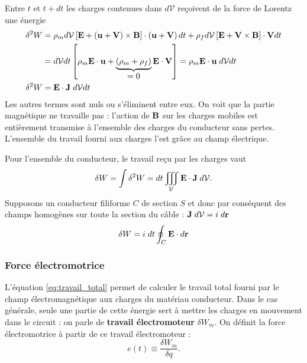 \documentclass[11pt,a4paper]{report}
\begin{document}
Entre $t$ et $t+dt$ les charges contenues dans $d\mathcal{V}$ reçoivent de la force de Lorentz une énergie
\begin{align*}
	\delta^2 W & 
	= \rho_m d\mathcal{V}\left[\bold{E}+\left(\bold{u}+\bold{V}\right)\times\bold{B}\right]
	\cdot\left(\bold{u}+\bold{V}\right)dt 
	+\rho_f d\mathcal{V}\left[\bold{E}+\bold{V}\times\bold{B}\right]\cdot\bold{V}dt\\
	& = d\mathcal{V}dt\left[\rho_m \bold{E}\cdot\bold{u} 
	+ \underbrace{\left(\rho_m + \rho_f\right)}_{\displaystyle{= 0}}
	\bold{E}\cdot\bold{\bold{V}}\right] 
	= \rho_m \bold{E}\cdot\bold{u}\;d\mathcal{V}dt\\
	\delta^2 W & = \bold{E}\cdot\bold{J}\;d\mathcal{V}dt 
\end{align*}
Les autres termes sont nuls ou s'éliminent entre eux. On voit que la partie magnétique ne travaille pas : l'action de $\bold{B}$ sur les charges mobiles est entièrement transmise à l'ensemble des charges du conducteur sans pertes. L'ensemble du travail fourni aux charges l'est grâce au champ électrique.

Pour l'ensemble du conducteur, le travail reçu par les charges vaut
\begin{equation}
	\delta W = \int \delta^2 W = dt\iiint_\mathcal{V} \bold{E}\cdot\bold{J}\;d\mathcal{V}.
\end{equation}
Supposons un conducteur filiforme $C$ de section $S$ et donc par conséquent des champs homogènes sur toute la section du câble : $\bold{J}\;d\mathcal{V} = i\;d\bold{r}$
\begin{equation}
	\delta W = i\;dt \oint_C \bold{E}\cdot d\bold{r}
	\label{eq:travail_total}
\end{equation}

\subsubsection{Force électromotrice}

L'équation \eqref{eq:travail_total} permet de calculer le travail total fourni par le champ électromagnétique aux charges du matériau conducteur. Dans le cas générale, seule une partie de cette énergie sert à mettre les charges en mouvement dans le circuit : on parle de \textbf{travail électromoteur} $\delta W_m$. On définit la force électromotrice à partir 
de ce travail électromoteur :
\begin{equation}
	e(t) \equiv \frac{\delta W_m}{\delta q}.
\end{equation}
\end{document}
